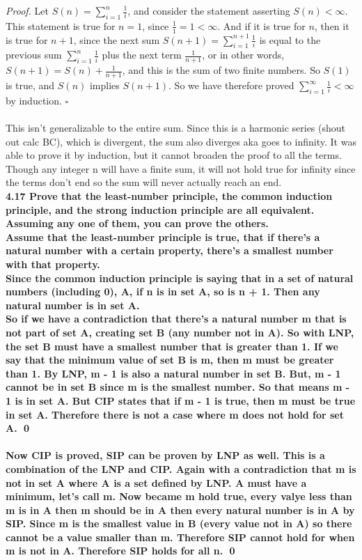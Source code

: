 \documentclass[12pt]{exam}
\begin{document}
\textit{Proof.} Let $S(n) = \sum_{i=1}^{n} \frac{1}{i}$, and consider the statement asserting $S(n) < \infty$. This statement is true for $n = 1$, since $\frac{1}{1} = 1 < \infty$. And if it is true for $n$, then it is true for $n + 1$, since the next sum $S(n + 1) = \sum_{i=1}^{n+1} \frac{1}{i}$ is equal to the previous sum $\sum_{i=1}^{n} \frac{1}{i}$ plus the next term $\frac{1}{n+1}$, or in other words, $S(n + 1) = S(n) + \frac{1}{n+1}$, and this is the sum of two finite numbers. So $S(1)$ is true, and $S(n)$ implies $S(n + 1)$. So we have therefore proved $\sum_{i=1}^{\infty} \frac{1}{i} < \infty$ by induction. \hfill $\square$
\\
\\This isn't generalizable to the entire sum. Since this is a harmonic series (shout out calc BC), which is divergent, the sum also diverges aka goes to infinity. It was able to prove it by induction, but it cannot broaden the proof to all the terms. Though any integer n will have a finite sum, it will not hold true for infinity since the terms don't end so the sum will never actually reach an end. 
\\

\bf 4.17 Prove that the least-number principle, the common induction principle, and the strong induction principle are all equivalent. Assuming any one of them, you can prove the others. 
\normalfont
\\Assume that the least-number principle is true, that if there's a natural number with a certain property, there's a smallest number with that property.
\\Since the common induction principle is saying that in a set of natural numbers (including 0), A, if n is in set A, so is n + 1. Then any natural number is in set A. 
\\So if we have a contradiction that there's a natural number m that is not part of set A, creating set B (any number not in A). So with LNP, the set B must have a smallest number that is greater than 1. If we say that the minimum value of set B is m, then m must be greater than 1. By LNP, m - 1 is also a natural number in set B. But, m - 1 cannot be in set B since m is the smallest number. So that means m - 1 is in set A. But CIP states that if  m - 1 is true, then m must be true in set A. Therefore there is not a case where m does not hold for set A. \qed
\\
\\Now CIP is proved, SIP can be proven by LNP as well. This is a combination of the LNP and CIP. Again with a contradiction that m is not in set A where A is a set defined by LNP. A must have a minimum, let's call m. Now became m hold true, every valye less than m is in A then m should be in A then every natural number is in A by SIP. Since m is the smallest value in B (every value not in A) so there cannot be a value smaller than m. Therefore SIP cannot hold for when m is not in A. Therefore SIP holds for all n. \qed
\end{document}
